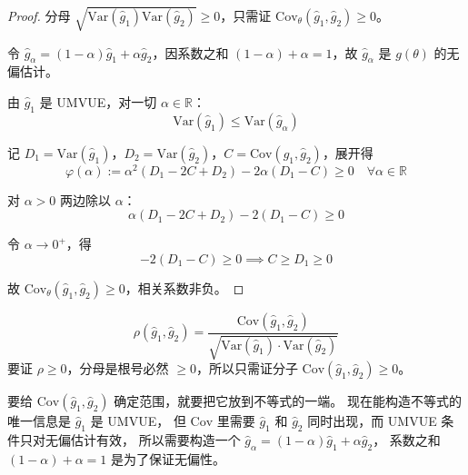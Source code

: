 \begin{proof}
分母 $\sqrt{\mathrm{Var}(\hat{g}_1)\mathrm{Var}(\hat{g}_2)} \geq 0$，只需证 $\mathrm{Cov}_\theta(\hat{g}_1,\hat{g}_2) \geq 0$。

令 $\hat{g}_\alpha = (1-\alpha)\hat{g}_1 + \alpha\hat{g}_2$，因系数之和 $(1-\alpha)+\alpha=1$，故 $\hat{g}_\alpha$ 是 $g(\theta)$ 的无偏估计。

由 $\hat{g}_1$ 是 UMVUE，对一切 $\alpha\in\mathbb{R}$：
$$\mathrm{Var}(\hat{g}_1) \leq \mathrm{Var}(\hat{g}_\alpha)$$

记 $D_1=\mathrm{Var}(\hat{g}_1)$，$D_2=\mathrm{Var}(\hat{g}_2)$，$C=\mathrm{Cov}(\hat{g}_1,\hat{g}_2)$，展开得
$$\varphi(\alpha) := \alpha^2(D_1-2C+D_2) - 2\alpha(D_1-C) \geq 0 \quad \forall\alpha\in\mathbb{R}$$

对 $\alpha>0$ 两边除以 $\alpha$：
$$\alpha(D_1-2C+D_2) - 2(D_1-C) \geq 0$$

令 $\alpha\to 0^+$，得
$$-2(D_1-C)\geq 0 \implies C \geq D_1 \geq 0$$

故 $\mathrm{Cov}_\theta(\hat{g}_1,\hat{g}_2) \geq 0$，相关系数非负。
\end{proof}
\begin{dxtips}
  
$$\rho(\hat{g}_1,\hat{g}_2) = \frac{\mathrm{Cov}(\hat{g}_1,\hat{g}_2)}{\sqrt{\mathrm{Var}(\hat{g}_1)\cdot\mathrm{Var}(\hat{g}_2)}}$$
要证 $\rho\geq 0$，分母是根号必然 $\geq 0$，所以只需证分子 $\mathrm{Cov}(\hat{g}_1,\hat{g}_2)\geq 0$。

\end{dxtips}
\begin{dxtips}
要给 $\mathrm{Cov}(\hat{g}_1,\hat{g}_2)$ 确定范围，就要把它放到不等式的一端。
现在能构造不等式的唯一信息是 $\hat{g}_1$ 是 UMVUE，
但 $\mathrm{Cov}$ 里需要 $\hat{g}_1$ 和 $\hat{g}_2$ 同时出现，而 UMVUE 条件只对无偏估计有效，
所以需要构造一个 $\hat{g}_\alpha = (1-\alpha)\hat{g}_1 + \alpha\hat{g}_2$，
系数之和 $(1-\alpha)+\alpha=1$ 是为了保证无偏性。
\end{dxtips}

